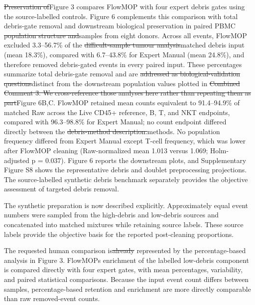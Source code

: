 \documentclass[
  11pt,
  a4paper,
]{article}
\begin{document}
{\color{revisionred}\sout{Preservation of}}{\color{revisionblue}Figure 3
compares FlowMOP with four expert debris gates using the source-labelled
controls. Figure 6 complements this comparison with total debris-gate
removal and} downstream {\color{revisionblue}biological preservation in
paired} PBMC {\color{revisionred}\sout{population structure
and}}{\color{revisionblue}samples from eight donors. Across all events,
FlowMOP excluded 3.3--56.7\% of} the
{\color{revisionred}\sout{difficult-sample tumour
analysis}}{\color{revisionblue}matched debris input (mean 18.3\%),
compared with 6.7--43.8\% for Expert Manual (mean 24.8\%), and therefore
removed debris-gated events in every paired input. These percentages
summarize total debris-gate removal and} are
{\color{revisionred}\sout{addressed as biological-validation
questions}}{\color{revisionblue}distinct from the downstream population
values plotted} in {\color{revisionred}\sout{Combined Comment 3. We
cross-reference those analyses here rather than repeating them as
part}}{\color{revisionblue}Figure 6B,C. FlowMOP retained mean counts
equivalent to 91.4--94.9\%} of {\color{revisionblue}matched Raw across
the Live CD45+ reference, B, T, and NKT endpoints, compared with
96.3--98.8\% for Expert Manual; no count endpoint differed directly
between} the {\color{revisionred}\sout{debris-method
description.}}{\color{revisionblue}methods. No population frequency
differed from Expert Manual except T-cell frequency, which was lower
after FlowMOP cleaning (Raw-normalized mean 1.013 versus 1.069;
Holm-adjusted p = 0.037). Figure 6 reports the downstream plots, and
Supplementary Figure S8 shows the representative debris and doublet
preprocessing projections. The source-labelled synthetic debris
benchmark separately provides the objective assessment of targeted
debris removal.}

The synthetic preparation is now described explicitly. Approximately
equal event numbers were sampled from the high-debris and low-debris
sources and concatenated into matched mixtures while retaining source
labels. These source labels provide the objective basis for the reported
post-cleaning proportions.

The requested human comparison is{\color{revisionred}\sout{already}}
represented by the percentage-based analysis in Figure 3.
FlowMOP\textquotesingle s enrichment of the labelled low-debris
component is compared directly with four expert gates, with mean
percentages, variability, and paired statistical comparisons. Because
the input event count differs between samples, percentage-based
retention and enrichment are more directly comparable than raw
removed-event counts.
\end{document}

